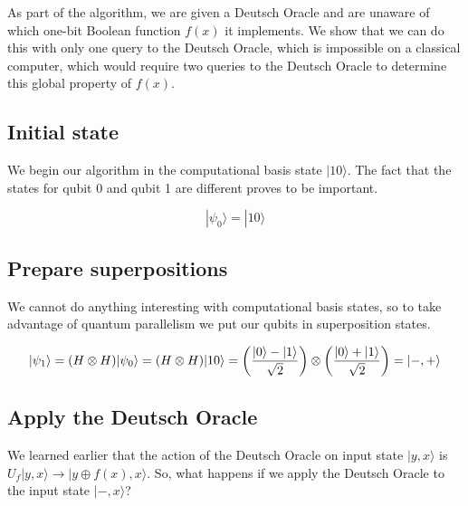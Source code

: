 \documentclass[12pt, letterpaper]{article}
\begin{document}
\vspace{2 mm}

\noindent
As part of the algorithm, we are given a Deutsch Oracle and are unaware of which one-bit Boolean function $f(x)$ it implements. We show that we can do this with only one query to the Deutsch Oracle, which is impossible on a classical computer, which would require two queries to the Deutsch Oracle to determine this global property of $f(x)$.

\subsection{Initial state}

We begin our algorithm in the computational basis state $|10\rangle$. The fact that the states for qubit 0 and qubit 1 are different proves to be important.

\begin{equation}
|\psi_0\rangle = |10\rangle
\end{equation}

\subsection{Prepare superpositions}

We cannot do anything interesting with computational basis states, so to take advantage of quantum parallelism we put our qubits in superposition states.\vspace{1 mm}

\begin{equation}
|\psi_1\rangle = (H \otimes H)|\psi_0\rangle = (H \otimes H)|10\rangle = \left( \dfrac{|0\rangle - |1\rangle}{\sqrt{2}}\right) \otimes \left( \dfrac{|0\rangle + |1\rangle}{\sqrt{2}}\right) = |-,+\rangle \vspace{1 mm}
\end{equation}

\subsection{Apply the Deutsch Oracle}

We learned earlier that the action of the Deutsch Oracle on input state $|y,x\rangle$ is $U_f|y, x\rangle \rightarrow |y \oplus f(x), x\rangle$. So, what happens if we apply the Deutsch Oracle to the input state $|-,x\rangle$?
\end{document}
